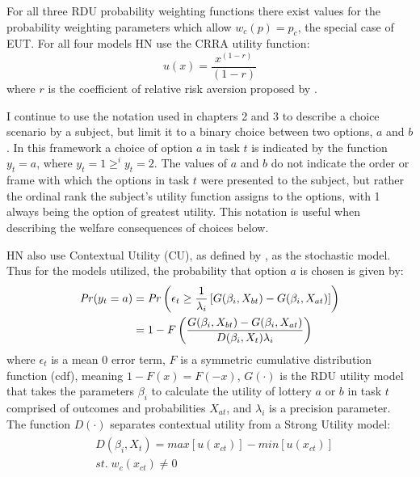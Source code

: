 \documentclass[../main.tex]{subfiles}
\begin{document}
For all three RDU probability weighting functions there exist values for the probability weighting parameters which allow $w_c(p) = p_c$, the special case of EUT.
For all four models HN use the CRRA utility function:
\begin{equation}
	\label{eq4:CRRA}
	u(x) = \frac{x^{(1-r)}}{(1-r)}
\end{equation}
\noindent where $r$ is the coefficient of relative risk aversion proposed by \textcite{Pratt1964}.

I continue to use the notation used in chapters 2 and 3 to describe a choice scenario by a subject, but limit it to a binary choice between two options, $a$ and $b$.
In this framework a choice of option $a$ in task $t$ is indicated by the function $y_t = a$, where $y_t = 1 \geq^i y_t = 2$.
The values of $a$ and $b$ do not indicate the order or frame with which the options in task $t$ were presented to the subject, but rather the ordinal rank the subject's utility function assigns to the options, with 1 always being the option of greatest utility.
This notation is useful when describing the welfare consequences of choices below.

HN also use Contextual Utility (CU), as defined by \textcite{Wilcox2008}, as the stochastic model.
Thus for the models utilized, the probability that option $a$ is chosen is given by:
\begin{align}
	\label{eq4:RE.2}
	\begin{split}
		{\ensuremath{\mathit{Pr}}}(y_t = a) &= {\mathit{Pr}}\left(  \epsilon_t \geq \frac{1}{\lambda_i} \left[ G(\beta_i,X_{bt}) - G(\beta_i,X_{at}) \right] \right)\\
		&= 1 - F\left( \dfrac{G(\beta_i,X_{bt}) - G(\beta_i,X_{at})}{D(\beta_i,X_t)\lambda_i }  \right)
	\end{split}
\end{align}
\noindent where $\epsilon_t$ is a mean 0 error term, $F$ is a symmetric cumulative distribution function (cdf), meaning $1 - F(x)  = F(-x)$, $G(\cdot)$ is the RDU utility model that takes the parameters $\beta_i$ to calculate the utility of lottery $a$ or $b$ in task $t$ comprised of outcomes and probabilities $X_{at}$, and $\lambda_i$ is a precision parameter.
The function $D(\cdot)$ separates contextual utility from a Strong Utility model:
\begin{align}
	\label{eq4:W.cu}
	\begin{split}
		&D(\beta_i,X_t) = \mathit{max}[u(x_{ct})] - \mathit{min}[u(x_{ct})]\\
		&\mathit{st.}\; w_c(x_{ct}) \neq 0
	\end{split}
\end{align}
\end{document}
